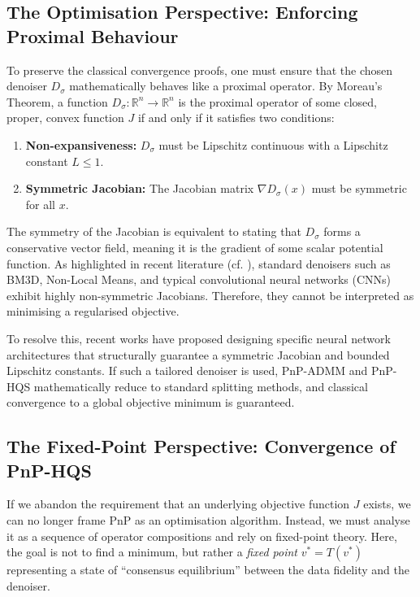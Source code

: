 \subsection{The Optimisation Perspective: Enforcing Proximal Behaviour}
To preserve the classical convergence proofs, one must ensure that the chosen denoiser $D_\sigma$ mathematically behaves like a proximal operator. By Moreau's Theorem, a function $D_\sigma: \mathbb{R}^n \to \mathbb{R}^n$ is the proximal operator of some closed, proper, convex function $J$ if and only if it satisfies two conditions:
\begin{enumerate}
    \item \textbf{Non-expansiveness:} $D_\sigma$ must be Lipschitz continuous with a Lipschitz constant $L \le 1$.
    \item \textbf{Symmetric Jacobian:} The Jacobian matrix $\nabla D_\sigma(x)$ must be symmetric for all $x$. 
\end{enumerate}

The symmetry of the Jacobian is equivalent to stating that $D_\sigma$ forms a conservative vector field, meaning it is the gradient of some scalar potential function. As highlighted in recent literature (cf. \cite{reehorst2018regularization}), standard denoisers such as BM3D, Non-Local Means, and typical convolutional neural networks (CNNs) exhibit highly non-symmetric Jacobians. Therefore, they cannot be interpreted as minimising a regularised objective. 

To resolve this, recent works have proposed designing specific neural network architectures that structurally guarantee a symmetric Jacobian and bounded Lipschitz constants. If such a tailored denoiser is used, PnP-ADMM and PnP-HQS mathematically reduce to standard splitting methods, and classical convergence to a global objective minimum is guaranteed.

\subsection{The Fixed-Point Perspective: Convergence of PnP-HQS}
If we abandon the requirement that an underlying objective function $J$ exists, we can no longer frame PnP as an optimisation algorithm. Instead, we must analyse it as a sequence of operator compositions and rely on fixed-point theory. Here, the goal is not to find a minimum, but rather a \emph{fixed point} $v^* = T(v^*)$ representing a state of ``consensus equilibrium'' between the data fidelity and the denoiser.

